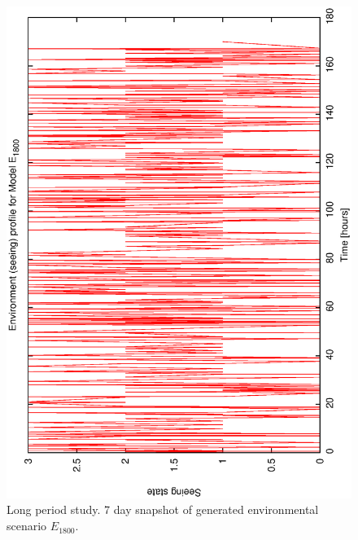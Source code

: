\begin{figure}[h]
\begin{center}
 \includegraphics[scale=0.5, angle=-90]{figures/e_18_prof.eps}
\end{center} 
 \caption[Environmental scenario (7 day snapshot).] 
   {Long period study. 7 day snapshot of generated environmental scenario $E_{1800}$.}
\label{fig:env_profile_18}
\end{figure}



